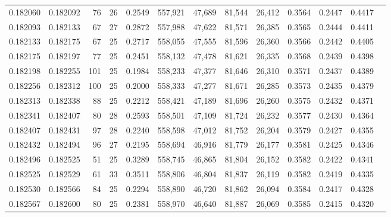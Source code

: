 \begin{tabular}{rrrrrrrrrrrrr}
0.182060 & 0.182092 &  76 &  26 &                                     0.2549 & 557,921 &  47,689 &  81,544 &  26,412 & 0.3564 & 0.2447 & 0.4417 \\
0.182093 & 0.182133 &  67 &  27 &                                     0.2872 & 557,988 &  47,622 &  81,571 &  26,385 & 0.3565 & 0.2444 & 0.4411 \\
0.182133 & 0.182175 &  67 &  25 &                                     0.2717 & 558,055 &  47,555 &  81,596 &  26,360 & 0.3566 & 0.2442 & 0.4405 \\
0.182175 & 0.182197 &  77 &  25 &                                     0.2451 & 558,132 &  47,478 &  81,621 &  26,335 & 0.3568 & 0.2439 & 0.4398 \\
0.182198 & 0.182255 & 101 &  25 &                                     0.1984 & 558,233 &  47,377 &  81,646 &  26,310 & 0.3571 & 0.2437 & 0.4389 \\
0.182256 & 0.182312 & 100 &  25 &                                     0.2000 & 558,333 &  47,277 &  81,671 &  26,285 & 0.3573 & 0.2435 & 0.4379 \\
0.182313 & 0.182338 &  88 &  25 &                                     0.2212 & 558,421 &  47,189 &  81,696 &  26,260 & 0.3575 & 0.2432 & 0.4371 \\
0.182341 & 0.182407 &  80 &  28 &                                     0.2593 & 558,501 &  47,109 &  81,724 &  26,232 & 0.3577 & 0.2430 & 0.4364 \\
0.182407 & 0.182431 &  97 &  28 &                                     0.2240 & 558,598 &  47,012 &  81,752 &  26,204 & 0.3579 & 0.2427 & 0.4355 \\
0.182432 & 0.182494 &  96 &  27 &                                     0.2195 & 558,694 &  46,916 &  81,779 &  26,177 & 0.3581 & 0.2425 & 0.4346 \\
0.182496 & 0.182525 &  51 &  25 &                                     0.3289 & 558,745 &  46,865 &  81,804 &  26,152 & 0.3582 & 0.2422 & 0.4341 \\
0.182525 & 0.182529 &  61 &  33 &                                     0.3511 & 558,806 &  46,804 &  81,837 &  26,119 & 0.3582 & 0.2419 & 0.4335 \\
0.182530 & 0.182566 &  84 &  25 &                                     0.2294 & 558,890 &  46,720 &  81,862 &  26,094 & 0.3584 & 0.2417 & 0.4328 \\
0.182567 & 0.182600 &  80 &  25 &                                     0.2381 & 558,970 &  46,640 &  81,887 &  26,069 & 0.3585 & 0.2415 & 0.4320 \\

\end{tabular}
